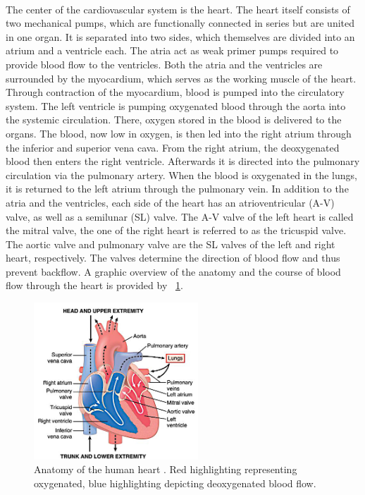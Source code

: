  \\The center of the cardiovascular system is the heart. The heart itself consists of two mechanical pumps, which are functionally connected in series but are united in one organ. It is separated into two sides, which themselves are divided into an atrium and a ventricle each. The atria act as weak primer pumps required to provide blood flow to the ventricles. \cite{HKS4} Both the atria and the ventricles are surrounded by the myocardium, which serves as the working muscle of the heart. Through contraction of the myocardium, blood is pumped into the circulatory system. \cite{HKS7} The left ventricle is pumping oxygenated blood through the aorta into the systemic circulation. There, oxygen stored in the blood is delivered to the organs. The blood, now low in oxygen, is then led into the right atrium through the inferior and superior vena cava. From the right atrium, the deoxygenated blood then enters the right ventricle. Afterwards it is directed into the pulmonary circulation via the pulmonary artery. When the blood is oxygenated in the lungs, it is returned to the left atrium through the pulmonary vein. \cite{HKS4} In addition to the atria and the ventricles, each side of the heart has an atrioventricular (A-V) valve, as well as a semilunar (SL) valve. The A-V valve of the left heart is called the mitral valve, the one of the right heart is referred to as the tricuspid valve. The aortic valve and pulmonary valve are the SL valves of the left and right heart, respectively. The valves determine the direction of blood flow and thus prevent backflow. \cite{HKS7} A graphic overview of the anatomy and the course of blood flow through the heart is provided by \figurename~\ref{fig:heart_anat}.
 \begin{figure}[!ht]
   \centering
   \includegraphics[width=0.55\textwidth]{images/chapt_2/heart_1.jpg}
   \caption[Anatomy of the human heart \cite{GH20}]{Anatomy of the human heart \cite{GH20}. Red highlighting representing oxygenated, blue highlighting depicting deoxygenated blood flow.}
   \label{fig:heart_anat}
 \end{figure}
